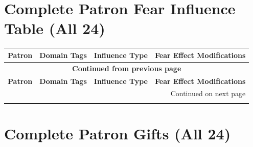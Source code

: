 \section{Complete Patron Fear Influence Table (All 24)}
\label{app:full-fear-table}

\begin{longtable}{@{}p{3.2cm}p{4.5cm}p{2.8cm}p{5.9cm}@{}}
\toprule
\textbf{Patron} & \textbf{Domain Tags} & \textbf{Influence Type} & \textbf{Fear Effect Modifications} \\
\midrule
\endfirsthead
\multicolumn{4}{c}{{\bfseries Continued from previous page}} \\
\toprule
\textbf{Patron} & \textbf{Domain Tags} & \textbf{Influence Type} & \textbf{Fear Effect Modifications} \\
\midrule
\endhead
\midrule
\multicolumn{4}{r}{{Continued on next page}} \\
\endfoot
\bottomrule
\endlastfoot


\end{longtable}

\section{Complete Patron Gifts (All 24)}
\label{app:full-gift-table}

\renewcommand{\arraystretch}{1.25}
\setlength{\LTpre}{0.5em}
\setlength{\LTpost}{0.5em}

